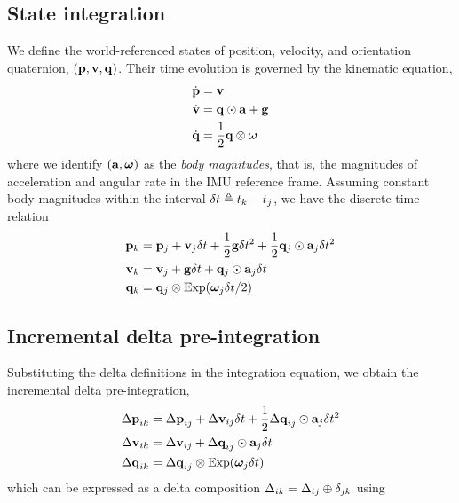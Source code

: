 \subsection{State integration}

We define the world-referenced states of position, velocity, and orientation quaternion, $({\bf p},{\bf v},{\bf q})$. 
Their time evolution is governed by the kinematic equation,
%
\begin{align}\label{equ:cont_basic}
\dot{{\bf p}} &= {\bf v} \\
\dot{{\bf v}} &= {\bf q}\odot{\bf a} + {\bf g} \\
\dot{{\bf q}} &= \frac12{\bf q}\otimes{{\bm \omega}} 
\end{align}
%
where we identify $({\bf a},{{\bm \omega}})$ as the \emph{body magnitudes}, that is, the magnitudes of acceleration and angular rate in the IMU reference frame.
Assuming constant body magnitudes within the interval $\delta t\triangleq t_k-t_j$, we have the discrete-time relation
%
\begin{align}\label{equ:g_second_order_integration}
\begin{split}
{\bf p}_{k} &= {\bf p}_j + {\bf v}_j\delta t  + \frac12{\bf g}\delta t^2 + \frac12{\bf q}_j\odot{\bf a}_j\delta t^2 \\
{\bf v}_{k} &= {\bf v}_j + {\bf g}\delta t + {\bf q}_j\odot{\bf a}_j\delta t \\
{\bf q}_{k} &= {\bf q}_j\otimes\operatorname*{Exp}({{\bm \omega}}_j\delta t/2) 
\end{split}
\end{align}


\subsection{Incremental delta pre-integration}
%
Substituting the delta definitions in the integration equation, we obtain the incremental delta pre-integration,
%
\begin{align}\label{equ:g_second_order_pre-integration}
\begin{split}
{\Delta{\bf p}}_{ik} 
&= {\Delta{\bf p}}_{ij} + {\Delta{\bf v}}_{ij}\delta t + \frac12{\Delta{\bf q}}_{ij}\odot{\bf a}_j\delta t^2 \\
{\Delta{\bf v}}_{ik} 
&= {\Delta{\bf v}}_{ij} + {\Delta{\bf q}}_{ij}\odot{\bf a}_j\delta t \\
{\Delta{\bf q}}_{ik} 
&= {\Delta{\bf q}}_{ij}\otimes\operatorname*{Exp}({{\bm \omega}}_j\delta t) 
\end{split}
\end{align}
%
%
which can be expressed as a delta composition $\Delta_{ik}=\Delta_{ij}\oplus\delta_{jk}$ using 



